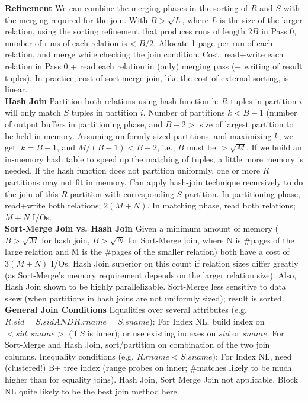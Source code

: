 \documentclass[10pt,landscape]{article}
\begin{document}
\begin{multicols}{3}
{\bf Refinement} We can combine the merging phases in the sorting of $R$ and $S$ with the merging required for the join. With $B>\sqrt{L}$, where $L$ is the size of the larger relation, using the sorting refinement that produces runs of length $2B$ in Pass 0, number of runs of each relation is < $B/2$. Allocate 1 page per run of each relation, and merge while checking the join condition. Cost: read+write each relation in Pass 0 + read each relation in (only) merging pass (+ writing of result tuples). In practice, cost of sort-merge join, like the cost of external sorting, is linear. \\
{\bf Hash Join} Partition both relations using hash function h: $R$ tuples in partition $i$ will only match $S$ tuples in partition $i$. Number of partitions $k < B-1$ (number of output buffers in partitioning phase, and $B-2 >$ size of largest partition to be held in memory. Assuming uniformly sized partitions, and maximizing $k$, we get: $k= B-1$, and $M/(B-1) < B-2$, i.e., $B$ must be $ > \sqrt{M}$. If we build an in-memory hash table to speed up the
matching of tuples, a little more memory is needed. If the hash function does not partition uniformly, one or more $R$ partitions may not fit in memory. Can apply hash-join technique recursively to do the join of this $R$-partition with corresponding $S$-partition. In partitioning phase, read+write both relations; $2(M+N)$. In matching phase, read both relations; $M+N$ I/Os.\\
{\bf  Sort-Merge Join vs. Hash Join} Given a minimum amount of memory ($B > \sqrt{M}$ for hash join, $B > \sqrt{N}$ for Sort-Merge join, where N is \#pages of the large relation and M is the \#pages of the smaller relation) both have a cost of $3(M+N)$ I/Os. Hash Join superior on this count if relation sizes differ greatly (as Sort-Merge's memory requirement depends on the larger relation size). Also, Hash Join shown to be highly parallelizable. Sort-Merge less sensitive to data skew (when partitions in hash joins are not uniformly sized); result is sorted.\\
{\bf General Join Conditions} Equalities over several attributes (e.g. $R.sid=S.sid AND R.rname=S.sname$): For Index NL, build index on $<sid, sname>$ (if $S$ is inner); or use existing indexes on $sid$ or $sname$. For Sort-Merge and Hash Join, sort/partition on combination of the two join columns. Inequality conditions (e.g. $R.rname < S.sname$): For Index NL, need (clustered!) B+ tree index (range probes on inner; \#matches likely to be much higher than for equality joins). Hash Join, Sort Merge Join not applicable. Block NL quite likely to be the best join method here.


\end{multicols}
\end{document}
